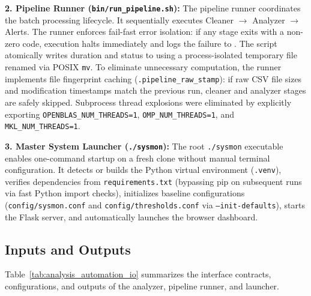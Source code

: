 \textbf{2. Pipeline Runner (\texttt{bin/run\_pipeline.sh}):}
The pipeline runner coordinates the batch processing lifecycle. It sequentially executes Cleaner $\rightarrow$ Analyzer $\rightarrow$ Alerts. The runner enforces fail-fast error isolation: if any stage exits with a non-zero code, execution halts immediately and logs the failure to . The script atomically writes duration and status to  using a process-isolated temporary file renamed via POSIX \texttt{mv}. To eliminate unnecessary computation, the runner implements file fingerprint caching (\texttt{.pipeline\_raw\_stamp}): if raw CSV file sizes and modification timestamps match the previous run, cleaner and analyzer stages are safely skipped. Subprocess thread explosions were eliminated by explicitly exporting \texttt{OPENBLAS\_NUM\_THREADS=1}, \texttt{OMP\_NUM\_THREADS=1}, and \texttt{MKL\_NUM\_THREADS=1}.

\textbf{3. Master System Launcher (\texttt{./sysmon}):}
The root \texttt{./sysmon} executable enables one-command startup on a fresh clone without manual terminal configuration. It detects or builds the Python virtual environment (\texttt{.venv}), verifies dependencies from \texttt{requirements.txt} (bypassing pip on subsequent runs via fast Python import checks), initializes baseline configurations (\texttt{config/sysmon.conf} and \texttt{config/thresholds.conf} via \texttt{--init-defaults}), starts the Flask server, and automatically launches the browser dashboard.

\subsection{Inputs and Outputs}
Table~\ref{tab:analysis_automation_io} summarizes the interface contracts, configurations, and outputs of the analyzer, pipeline runner, and launcher.

